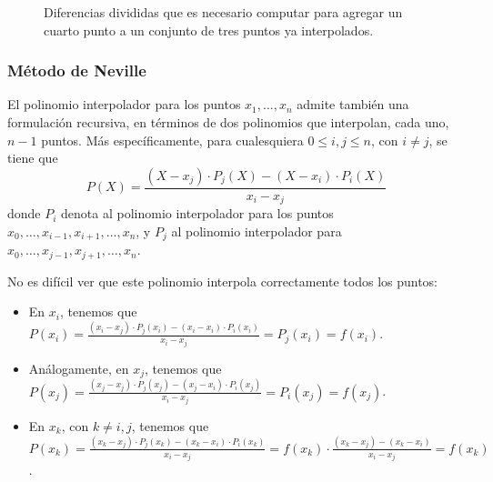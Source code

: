 \begin{figure}[H]
\begin{center}
\end{center}

\label{dif-divididas}
\caption{Diferencias divididas que es necesario computar para agregar un
cuarto punto a un conjunto de tres puntos ya interpolados.}
\end{figure}

\subsubsection{Método de Neville}

El polinomio interpolador para los puntos $x_1, \dots, x_n$ admite
también una formulación recursiva, en términos de dos polinomios que
interpolan, cada uno, $n-1$ puntos. Más específicamente, para cualesquiera
$0 \leq i,j \leq n$, con $i \neq j$, se tiene que
\[ P(X) = \frac{(X - x_j) \cdot P_j(X) - (X - x_i) \cdot P_i(X)}{x_i - x_j} \]
donde $P_i$ denota al polinomio interpolador para los puntos
$x_0,\dots,x_{i-1},x_{i+1},\dots,x_n$, y $P_j$ al polinomio interpolador para
$x_0,\dots,x_{j-1},x_{j+1},\dots,x_n$.

No es difícil ver que este polinomio interpola correctamente todos los puntos:
\begin{itemize}
\item En $x_i$, tenemos que $P(x_i)
    = \frac{(x_i - x_j) \cdot P_j(x_i) - (x_i - x_i) \cdot P_i(x_i)}{x_i - x_j}
    = P_j(x_i) = f(x_i)$.
\item Análogamente, en $x_j$, tenemos que $P(x_j)
    = \frac{(x_j - x_j) \cdot P_j(x_j) - (x_j - x_i) \cdot P_i(x_j)}{x_i - x_j}
    = P_i(x_j) = f(x_j)$.
\item En $x_k$, con $k \neq i, j$, tenemos que $P(x_k)
    = \frac{(x_k - x_j) \cdot P_j(x_k) - (x_k - x_i) \cdot P_i(x_k)}{x_i - x_j}
    = f(x_k) \cdot \frac{(x_k - x_j) - (x_k - x_i)}{x_i - x_j} = f(x_k)$.
\end{itemize}

